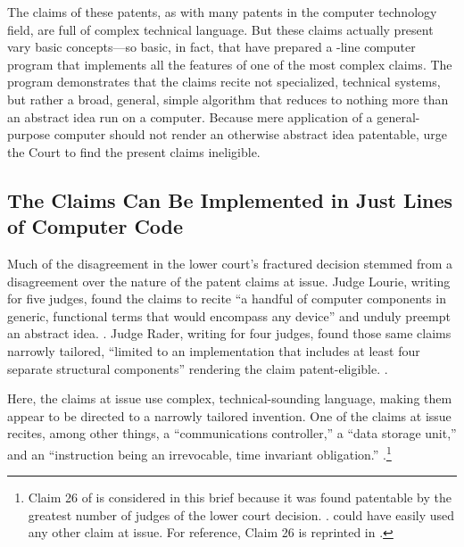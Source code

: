 \documentclass{scotus}
\begin{document}
The claims of these patents, as with many patents in the computer technology
field, are full of complex technical language.
But these claims actually present vary basic concepts---so basic, in fact, that
\amici have prepared a \numlines-line computer program
that implements all the features of one of the most complex claims. The program
demonstrates that the claims recite not specialized, technical systems, but
rather a broad, general, simple algorithm that reduces to nothing more than an
abstract idea run on a computer. Because mere application of a general-purpose
computer should not render an otherwise abstract idea patentable, \amici
urge the Court to find the present claims ineligible.



%
%
\subsection{The Claims Can Be Implemented in Just \Numlines Lines of
Computer Code}

Much of the disagreement in the lower court's fractured decision stemmed
from a disagreement over the nature of the patent claims at issue. Judge Lourie,
writing for five judges,
found the claims to recite ``a handful of
computer components in generic, functional terms that would encompass any
device'' and unduly preempt an abstract idea. .
Judge Rader, writing for four judges, found those same claims narrowly tailored,
``limited to an implementation that includes at least four separate structural
components'' rendering the claim patent-eligible. .

Here, the claims at issue use complex, technical-sounding language, making them
appear to be directed to a narrowly tailored invention. One of the claims at
issue recites, among other things, a ``communications controller,'' a
``data storage unit,'' and an ``instruction being an irrevocable, time invariant
obligation.'' .\footnote{Claim 26 of
 is considered in this brief because it was found patentable by
the greatest number of judges of the lower court decision. .
\Amici could have easily used any other claim at issue.
For reference, Claim
26 is reprinted in .}
\end{document}
